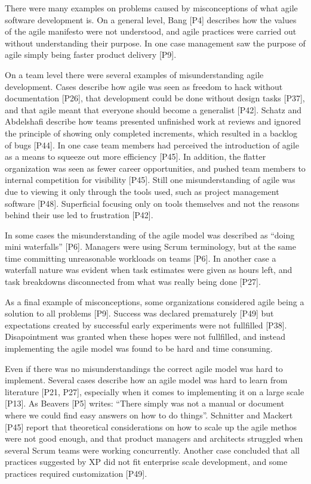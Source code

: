 \documentclass[preprint,authoryear,12pt]{elsarticle}
\begin{document}

There were many examples on problems caused by misconceptions of what agile
software development is. On a general level, Bang [P4] describes how the values
of the agile manifesto were not understood, and agile practices were carried out
without understanding their purpose. In one case management saw the purpose of
agile simply being faster product delivery [P9].

On a team level there were several examples of misunderstanding agile
development. Cases describe how agile was seen as freedom to hack without
documentation [P26], that development could be done without design tasks [P37],
and that agile meant that everyone should become a generalist [P42]. Schatz and
Abdelshafi describe how teams presented unfinished work at reviews and ignored
the principle of showing only completed increments, which resulted in a backlog
of bugs [P44]. In one case team members had perceived the introduction of agile
as a means to squeeze out more efficiency [P45]. In addition, the flatter
organization was seen as fewer career opportunities, and pushed team members to
internal competition for visibility [P45].
Still one misunderstanding of agile was due to viewing it only through the tools
used, such as project management software [P48]. Superficial focusing only on
tools themselves and not the reasons behind their use led to frustration [P42].

In some cases the misunderstanding of the agile model was described as ``doing
mini waterfalls'' [P6]. Managers were using Scrum terminology, but at the same
time committing unreasonable workloads on teams [P6]. In another case a
waterfall nature was evident when task estimates were given as hours left, and
task breakdowns disconnected from what was really being done [P27].

As a final example of misconceptions, some organizations considered agile being
a solution to all problems [P9]. Success was declared prematurely [P49] but
expectations created by successful early experiments were not fullfilled [P38].
Disapointment was granted when these hopes were not fullfilled, and instead
implementing the agile model was found to be hard and time consuming.


Even if there was no misunderstandings the correct agile model was hard to
implement. Several cases describe how an agile model was hard to learn from
literature [P21, P27], especially when it comes to implementing it on a large
scale [P13]. As Beavers [P5] writes: ``There simply was not a manual or document
where we could find easy answers on how to do things''.
Schnitter and Mackert [P45] report that theoretical considerations on how to
scale up the agile methos were not good enough, and that product managers and
architects struggled when several Scrum teams were working concurrently.
Another case concluded that all practices suggested by XP did not fit enterprise
scale development, and some practices required customization [P49].
\end{document}
